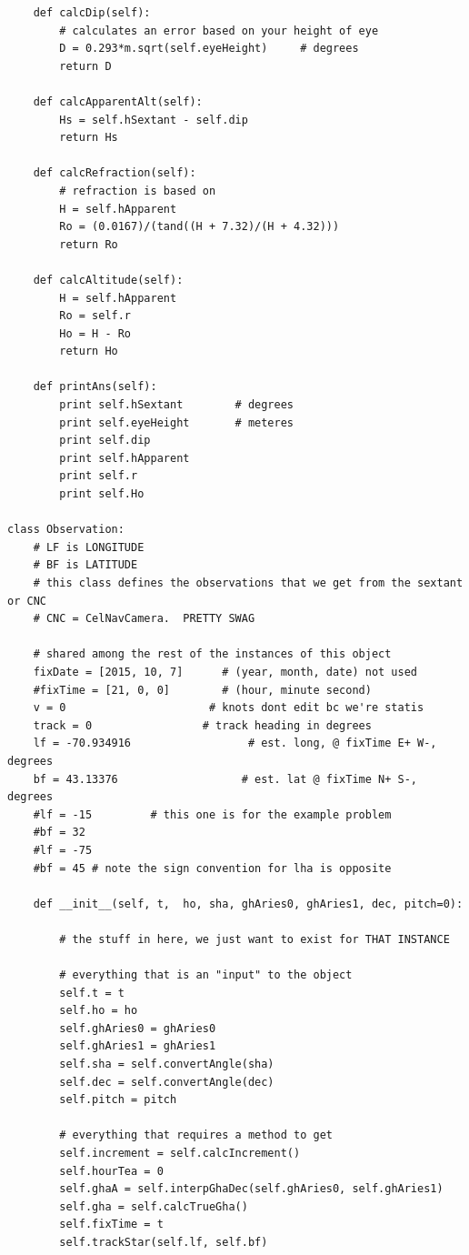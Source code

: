 \documentclass[12pt,a4paper]{book}
\begin{document}
\begin{appendices}
\begin{verbatim}
    def calcDip(self):
        # calculates an error based on your height of eye
        D = 0.293*m.sqrt(self.eyeHeight)     # degrees
        return D

    def calcApparentAlt(self):
        Hs = self.hSextant - self.dip 
        return Hs
        
    def calcRefraction(self):
        # refraction is based on 
        H = self.hApparent
        Ro = (0.0167)/(tand((H + 7.32)/(H + 4.32)))
        return Ro
    
    def calcAltitude(self):
        H = self.hApparent
        Ro = self.r
        Ho = H - Ro
        return Ho
 
    def printAns(self):
        print self.hSextant        # degrees
        print self.eyeHeight       # meteres
        print self.dip
        print self.hApparent 
        print self.r 
        print self.Ho

class Observation:
    # LF is LONGITUDE
    # BF is LATITUDE
    # this class defines the observations that we get from the sextant or CNC
    # CNC = CelNavCamera.  PRETTY SWAG
    
    # shared among the rest of the instances of this object
    fixDate = [2015, 10, 7]      # (year, month, date) not used
    #fixTime = [21, 0, 0]        # (hour, minute second)
    v = 0                      # knots dont edit bc we're statis
    track = 0                 # track heading in degrees 
    lf = -70.934916                  # est. long, @ fixTime E+ W-, degrees
    bf = 43.13376                   # est. lat @ fixTime N+ S-, degrees    
    #lf = -15         # this one is for the example problem
    #bf = 32
    #lf = -75
    #bf = 45 # note the sign convention for lha is opposite

    def __init__(self, t,  ho, sha, ghAries0, ghAries1, dec, pitch=0):
        
        # the stuff in here, we just want to exist for THAT INSTANCE

        # everything that is an "input" to the object
        self.t = t
        self.ho = ho
        self.ghAries0 = ghAries0
        self.ghAries1 = ghAries1
        self.sha = self.convertAngle(sha)
        self.dec = self.convertAngle(dec)
        self.pitch = pitch

        # everything that requires a method to get
        self.increment = self.calcIncrement()
        self.hourTea = 0 
        self.ghaA = self.interpGhaDec(self.ghAries0, self.ghAries1)
        self.gha = self.calcTrueGha()
        self.fixTime = t
        self.trackStar(self.lf, self.bf)


\end{verbatim}
\end{appendices}
\end{document}

